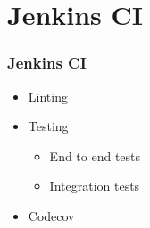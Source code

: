 \documentclass[12pt]{beamer}
\begin{document}
    \section{Jenkins CI}
    
	\begin{frame}
		\frametitle{Jenkins CI}
		\begin{itemize}
            \item Linting
            \item Testing
            \begin{itemize}
                \item End to end tests
                \item Integration tests
            \end{itemize}
            \item Codecov
		\end{itemize}
    \end{frame}
\end{document}
